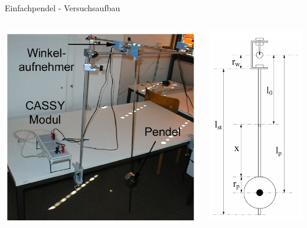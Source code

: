 \documentclass[12pt]{beamer}
\begin{document}
\begin{frame}{Einfachpendel - Versuchsaufbau}
\begin{columns}[T]
	\centering
	\hskip 1cm
	\begin{column}{.5\textwidth}
		\begin{block}{}
			\includegraphics[scale=0.4]{Selection_073.jpg}
		\end{block}
	\end{column}
	\hskip 2cm
	\begin{column}{.5\textwidth}
		\begin{block}{}
			\includegraphics[scale=0.4]{Selection_072.jpg}
		\end{block}
	\end{column}
\end{columns}

\end{frame}
\end{document}
